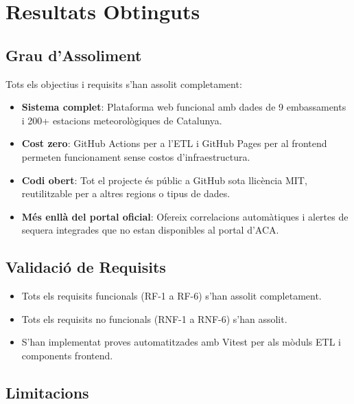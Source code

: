 \documentclass[11pt, a4paper]{article}
\begin{document}

\section{Resultats Obtinguts}

\subsection{Grau d'Assoliment}

Tots els objectius i requisits s'han assolit completament:

\begin{itemize}[leftmargin=*]
    \item \textbf{Sistema complet}: Plataforma web funcional amb dades de 9 embassaments i 200+ estacions meteorològiques de Catalunya.
    \item \textbf{Cost zero}: GitHub Actions per a l'ETL i GitHub Pages per al frontend permeten funcionament sense costos d'infraestructura.
    \item \textbf{Codi obert}: Tot el projecte és públic a GitHub sota llicència MIT, reutilitzable per a altres regions o tipus de dades.
    \item \textbf{Més enllà del portal oficial}: Ofereix correlacions automàtiques i alertes de sequera integrades que no estan disponibles al portal d'ACA.
\end{itemize}

\subsection{Validació de Requisits}

\begin{itemize}[leftmargin=*]
    \item Tots els requisits funcionals (RF-1 a RF-6) s'han assolit completament.
    \item Tots els requisits no funcionals (RNF-1 a RNF-6) s'han assolit.
    \item S'han implementat proves automatitzades amb Vitest per als mòduls ETL i components frontend.
\end{itemize}

\subsection{Limitacions}
\end{document}
